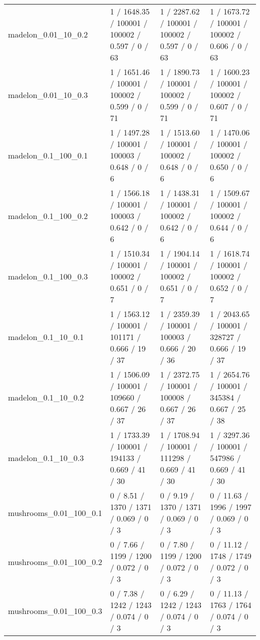\begin{tabular}{llll}
       madelon\_0.01\_10\_0.2 &   1 / 1648.35 / 100001 /  100002 / 0.597 /      0 /     63 &   1 / 2287.62 / 100001 /  100002 / 0.597 /      0 /     63 &   1 / 1673.72 / 100001 /  100002 / 0.606 /      0 /     63 \\
       madelon\_0.01\_10\_0.3 &   1 / 1651.46 / 100001 /  100002 / 0.599 /      0 /     71 &   1 / 1890.73 / 100001 /  100002 / 0.599 /      0 /     71 &   1 / 1600.23 / 100001 /  100002 / 0.607 /      0 /     71 \\
       madelon\_0.1\_100\_0.1 &   1 / 1497.28 / 100001 /  100003 / 0.648 /      0 /      6 &   1 / 1513.60 / 100001 /  100002 / 0.648 /      0 /      6 &   1 / 1470.06 / 100001 /  100002 / 0.650 /      0 /      6 \\
       madelon\_0.1\_100\_0.2 &   1 / 1566.18 / 100001 /  100003 / 0.642 /      0 /      6 &   1 / 1438.31 / 100001 /  100002 / 0.642 /      0 /      6 &   1 / 1509.67 / 100001 /  100002 / 0.644 /      0 /      6 \\
       madelon\_0.1\_100\_0.3 &   1 / 1510.34 / 100001 /  100002 / 0.651 /      0 /      7 &   1 / 1904.14 / 100001 /  100002 / 0.651 /      0 /      7 &   1 / 1618.74 / 100001 /  100002 / 0.652 /      0 /      7 \\
        madelon\_0.1\_10\_0.1 &   1 / 1563.12 / 100001 /  101171 / 0.666 /     19 /     37 &   1 / 2359.39 / 100001 /  100003 / 0.666 /     20 /     36 &   1 / 2043.65 / 100001 /  328727 / 0.666 /     19 /     37 \\
        madelon\_0.1\_10\_0.2 &   1 / 1506.09 / 100001 /  109660 / 0.667 /     26 /     37 &   1 / 2372.75 / 100001 /  100008 / 0.667 /     26 /     37 &   1 / 2654.76 / 100001 /  345384 / 0.667 /     25 /     38 \\
        madelon\_0.1\_10\_0.3 &   1 / 1733.39 / 100001 /  194133 / 0.669 /     41 /     30 &   1 / 1708.94 / 100001 /  111298 / 0.669 /     41 /     30 &   1 / 3297.36 / 100001 /  547986 / 0.669 /     41 /     30 \\
    mushrooms\_0.01\_100\_0.1 &      0 / 8.51 /   1370 /    1371 / 0.069 /      0 /      3 &      0 / 9.19 /   1370 /    1371 / 0.069 /      0 /      3 &     0 / 11.63 /   1996 /    1997 / 0.069 /      0 /      3 \\
    mushrooms\_0.01\_100\_0.2 &      0 / 7.66 /   1199 /    1200 / 0.072 /      0 /      3 &      0 / 7.80 /   1199 /    1200 / 0.072 /      0 /      3 &     0 / 11.12 /   1748 /    1749 / 0.072 /      0 /      3 \\
    mushrooms\_0.01\_100\_0.3 &      0 / 7.38 /   1242 /    1243 / 0.074 /      0 /      3 &      0 / 6.29 /   1242 /    1243 / 0.074 /      0 /      3 &     0 / 11.13 /   1763 /    1764 / 0.074 /      0 /      3 \\

\end{tabular}
